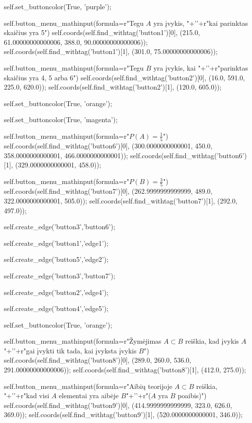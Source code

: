 self.set_buttoncolor(True, 'purple');

self.button_menu_mathinput(formula=r"Tegu $A$ yra įvykis, "+'\n'+r"kai parinktas skaičius yra 5")
self.coords(self.find_withtag('button1')[0], (215.0, 61.00000000000006, 388.0, 90.00000000000006));
self.coords(self.find_withtag('button1')[1], (301.0, 75.00000000000006));

self.button_menu_mathinput(formula=r"Tegu $B$ yra įvykis, kai "+'\n'+r"parinktas skaičius yra 4, 5 arba 6")
self.coords(self.find_withtag('button2')[0], (16.0, 591.0, 225.0, 620.0));
self.coords(self.find_withtag('button2')[1], (120.0, 605.0));

self.set_buttoncolor(True, 'orange');


self.set_buttoncolor(True, 'magenta');





self.button_menu_mathinput(formula=r"$P(A)=\frac{1}{5}$")
self.coords(self.find_withtag('button6')[0], (300.0000000000001, 450.0, 358.0000000000001, 466.0000000000001));
self.coords(self.find_withtag('button6')[1], (329.0000000000001, 458.0));

self.button_menu_mathinput(formula=r"$P(B)=\frac{3}{5}$")
self.coords(self.find_withtag('button7')[0], (262.9999999999999, 489.0, 322.0000000000001, 505.0));
self.coords(self.find_withtag('button7')[1], (292.0, 497.0));

self.create_edge('button3','button6');

self.create_edge('button1','edge1');

self.create_edge('button5','edge2');

self.create_edge('button3','button7');

self.create_edge('button2','edge4');

self.create_edge('button4','edge5');

self.set_buttoncolor(True, 'orange');

self.button_menu_mathinput(formula=r"Žymėjimas $A \subset B$ reiškia, kad įvykis $A$ "+'\n'+r"gai įvykti tik tada, kai įvyksta įvykis $B$")
self.coords(self.find_withtag('button8')[0], (289.0, 260.0, 536.0, 291.00000000000006));
self.coords(self.find_withtag('button8')[1], (412.0, 275.0));

self.button_menu_mathinput(formula=r"Aibių teorijoje $A \subset B$ reiškia, "+'\n'+r"kad visi $A$ elementai yra aibėje $B$"+'\n'+r"($A$ yra $B$ poaibis)")
self.coords(self.find_withtag('button9')[0], (414.9999999999999, 323.0, 626.0, 369.0));
self.coords(self.find_withtag('button9')[1], (520.0000000000001, 346.0));



